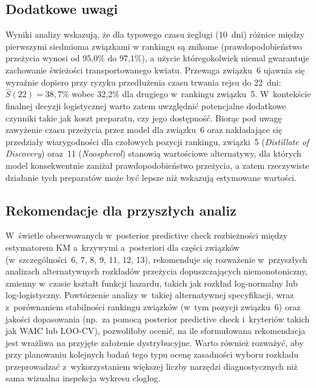 \documentclass[12pt, a4paper]{article}
\begin{document}
\subsection{Dodatkowe uwagi}
Wyniki analizy wskazują, że dla typowego czasu żeglugi (10~dni) różnice między pierwszymi siedmioma związkami w rankingu są znikome (prawdopodobieństwo przeżycia wynosi od 95,0\% do 97,1\%), a użycie któregokolwiek niemal gwarantuje zachowanie świeżości transportowanego kwiatu.
 Przewaga związku~6 ujawnia się wyraźnie dopiero przy ryzyku przedłużenia czasu trwania rejsu do 22~dni: $\hat{S}(22) = 38{,}7\%$ wobec 32,2\% dla drugiego w~rankingu związku~5. W~kontekście finalnej decyzji logistycznej warto zatem uwzględnić potencjalne dodatkowe czynniki takie jak koszt preparatu, czy jego dostępność. Biorąc pod uwagę zawyżenie czasu przeżycia przez model dla związku~6 
oraz nakładające się przedziały wiarygodności dla czołowych pozycji 
rankingu, związki~5 (\textit{Distillate of Discovery}) oraz~11 
(\textit{Noospherol}) stanowią wartościowe alternatywy, dla których 
model konsekwentnie zaniżał prawdopodobieństwo przeżycia, a zatem rzeczywiste 
działanie tych preparatów może być lepsze niż wskazują estymowane wartości.

\subsection{Rekomendacje dla przyszłych analiz}
 
W~świetle obserwowanych w~posterior predictive check rozbieżności między estymatorem KM a~krzywymi a~posteriori dla części związków (w~szczególności~6, 7, 8, 9, 11, 12, 13), rekomenduje się rozważenie w~przyszłych analizach alternatywnych rozkładów przeżycia dopuszczających niemonotoniczny, zmienny w~czasie kształt funkcji hazardu, takich jak rozkład log-normalny lub log-logistyczny. Powtórzenie analizy w~takiej alternatywnej specyfikacji, wraz z~porównaniem stabilności rankingu związków (w~tym pozycji związku~6) oraz jakości dopasowania (np.~za pomocą posterior predictive check i~kryteriów takich jak WAIC lub LOO-CV), pozwoliłoby ocenić, na ile sformułowana rekomendacja jest wrażliwa na przyjęte założenie dystrybucyjne. Warto również rozważyć, aby przy planowaniu kolejnych badań tego typu ocenę zasadności wyboru rozkładu przeprowadzać z~wykorzystaniem większej liczby narzędzi diagnostycznych niż sama wizualna inspekcja wykresu cloglog.
\end{document}
